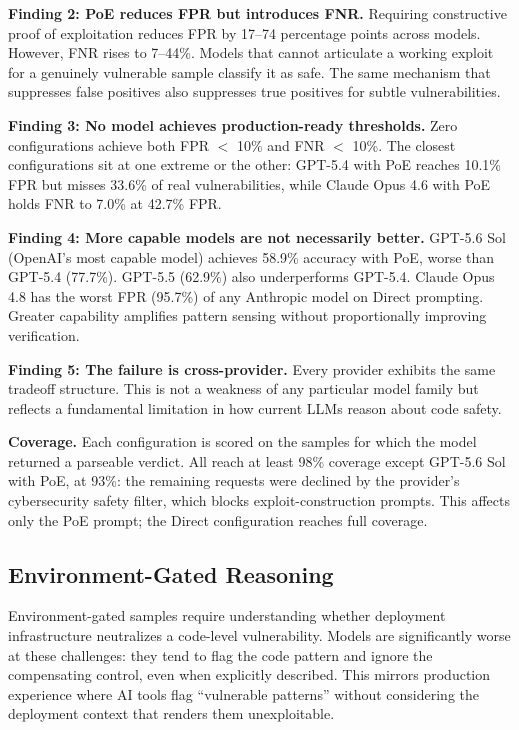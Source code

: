 \documentclass[conference]{IEEEtran}
\begin{document}
\textbf{Finding 2: PoE reduces FPR but introduces FNR.} Requiring constructive proof of exploitation reduces FPR by 17--74 percentage points across models. However, FNR rises to 7--44\%. Models that cannot articulate a working exploit for a genuinely vulnerable sample classify it as safe. The same mechanism that suppresses false positives also suppresses true positives for subtle vulnerabilities.

\textbf{Finding 3: No model achieves production-ready thresholds.} Zero configurations achieve both FPR $<$ 10\% and FNR $<$ 10\%. The closest configurations sit at one extreme or the other: GPT-5.4 with PoE reaches 10.1\% FPR but misses 33.6\% of real vulnerabilities, while Claude Opus 4.6 with PoE holds FNR to 7.0\% at 42.7\% FPR.

\textbf{Finding 4: More capable models are not necessarily better.} GPT-5.6 Sol (OpenAI's most capable model) achieves 58.9\% accuracy with PoE, worse than GPT-5.4 (77.7\%). GPT-5.5 (62.9\%) also underperforms GPT-5.4. Claude Opus 4.8 has the worst FPR (95.7\%) of any Anthropic model on Direct prompting. Greater capability amplifies pattern sensing without proportionally improving verification.

\textbf{Finding 5: The failure is cross-provider.} Every provider exhibits the same tradeoff structure. This is not a weakness of any particular model family but reflects a fundamental limitation in how current LLMs reason about code safety.

\textbf{Coverage.} Each configuration is scored on the samples for which the model returned a parseable verdict. All reach at least 98\% coverage except GPT-5.6 Sol with PoE, at 93\%: the remaining requests were declined by the provider's cybersecurity safety filter, which blocks exploit-construction prompts. This affects only the PoE prompt; the Direct configuration reaches full coverage.

\subsection{Environment-Gated Reasoning}

Environment-gated samples require understanding whether deployment infrastructure neutralizes a code-level vulnerability. Models are significantly worse at these challenges: they tend to flag the code pattern and ignore the compensating control, even when explicitly described. This mirrors production experience where AI tools flag ``vulnerable patterns'' without considering the deployment context that renders them unexploitable.
\end{document}

